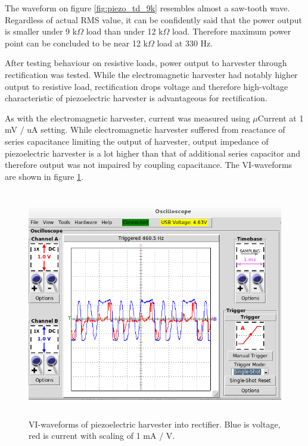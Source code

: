 The waveform on figure \ref{fig:piezo_td_9k} resembles almost a saw-tooth wave. Regardless of actual RMS value, it can be confidently said that the power output is smaller under 9 k$\Omega$ load than under 12 k$\Omega$ load. Therefore maximum power point can be concluded to be near 12 k$\Omega$ load at 330 Hz. 

After testing behaviour on resistive loads, power output to harvester through rectification was tested. While the electromagnetic harvester had notably higher output to resistive load, rectification drops voltage and therefore high-voltage characteristic of piezoelectric harvester is advantageous for rectification. 

As with the electromagnetic harvester, current was measured using $\mu$Current at 1 mV / uA setting. While electromagnetic harvester suffered from reactance of series capacitance limiting the output of harvester, output impedance of piezoelectric harvester is a lot higher than that of additional series capacitor and therefore output was not impaired by coupling capacitance. The VI-waveforms are shown in figure \ref{fig:piezo_td_vi}. 

\begin{figure}[htb]
\begin{center}
\includegraphics[height=10cm]{images/own_measurement/generator_shaker/piezo_td_vi_330hz_2_3.png}
\end{center}
\caption{\label{fig:piezo_td_vi} VI-waveforms of piezoelectric harvester into rectifier. Blue is voltage, red is current with scaling of 1 mA / V.}
\end{figure}

